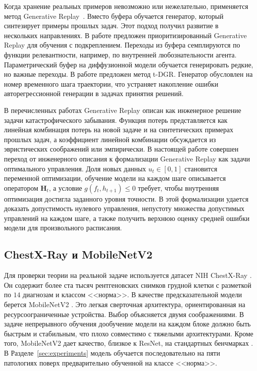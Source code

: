 \documentclass[a4paper,14pt,oneside,openany]{extarticle}
\newcommand{\bH}{\mathbf{H}}
\begin{document}
Когда хранение реальных примеров невозможно или нежелательно, применяется метод Generative Replay~\cite{shin2017continual}. Вместо буфера обучается генератор, который синтезирует примеры прошлых задач. Этот подход получил развитие в нескольких направлениях. В работе \cite{wang2025prioritized} предложен приоритизированный Generative Replay для обучения с подкреплением. Переходы из буфера семплируются по функции релевантности, например, по внутренней любознательности агента. Параметрический буфер на диффузионной модели обучается генерировать редкие, но важные переходы. В работе \cite{yue2024t} предложен метод t-DGR. Генератор обусловлен на номер временного шага траектории, что устраняет накопление ошибки авторегрессионной генерации в задачах принятия решений.

В перечисленных работах Generative Replay описан как инженерное решение задачи катастрофического забывания. Функция потерь представляется как линейная комбинация потерь на новой задаче и на синтетических примерах прошлых задач, а коэффициент линейной комбинации обсуждается из эвристических соображений или эмпирически. В настоящей работе совершен переход от инженерного описания к формализации Generative Replay как задачи оптимального управления. Доля новых данных $u_t \in [0, 1]$ становится переменной оптимизации, обучение модели на каждом шаге описывается оператором $\bH_t$, а условие $g(f_t, h_{t+1}) \leq 0$ требует, чтобы внутренняя оптимизация достигла заданного уровня точности. В этой формализации удается доказать допустимость нулевого управления, непустоту множества допустимых управлений на каждом шаге, а также получить верхнюю оценку средней ошибки модели для произвольного расписания.

\subsection{ChestX-Ray и MobileNetV2}

Для проверки теории на реальной задаче используется датасет NIH ChestX-Ray \cite{wang2017chestx}. Он содержит более ста тысяч рентгеновских снимков грудной клетки с разметкой по $14$ диагнозам и классом <<норма>>. В качестве предсказательной модели берется MobileNetV2 \cite{sandler2018mobilenetv2}. Это легкая сверточная архитектура, ориентированная на ресурсоограниченные устройства. Выбор объясняется двумя соображениями. В задаче непрерывного обучения дообучение модели на каждом блоке должно быть быстрым и стабильным, что плохо совместимо с тяжелыми архитектурами. Кроме того, MobileNetV2 дает качество, близкое к ResNet, на стандартных бенчмарках \cite{sandler2018mobilenetv2}.
В Разделе~\ref{sec:experiments} модель обучается последовательно на пяти патологиях поверх предварительно обученной на классе <<норма>>. 
\end{document}
